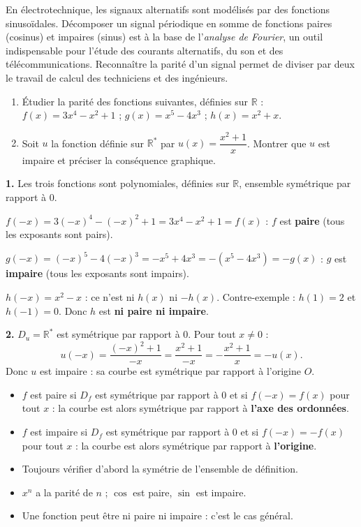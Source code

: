 \documentclass[11pt]{article}
\newcommand{\cle}[1]{{\popxbold\color{popdark}#1}}
\begin{document}
\begin{savaistu}
En électrotechnique, les signaux alternatifs sont modélisés par des fonctions sinusoïdales. Décomposer un signal périodique en somme de fonctions paires (cosinus) et impaires (sinus) est à la base de l'\emph{analyse de Fourier}, un outil indispensable pour l'étude des courants alternatifs, du son et des télécommunications. Reconnaître la parité d'un signal permet de diviser par deux le travail de calcul des techniciens et des ingénieurs.
\end{savaistu}

\begin{exercice}
\begin{enumerate}
\item Étudier la parité des fonctions suivantes, définies sur $\mathbb{R}$ : $f(x)=3x^4-x^2+1$ ; $g(x)=x^5-4x^3$ ; $h(x)=x^2+x$.
\item Soit $u$ la fonction définie sur $\mathbb{R}^*$ par $u(x)=\dfrac{x^2+1}{x}$. Montrer que $u$ est impaire et préciser la conséquence graphique.
\end{enumerate}
\end{exercice}

\begin{corrige}[Exercice 1]
\textbf{1.} Les trois fonctions sont polynomiales, définies sur $\mathbb{R}$, ensemble symétrique par rapport à $0$.

$f(-x)=3(-x)^4-(-x)^2+1=3x^4-x^2+1=f(x)$ : $f$ est \textbf{paire} (tous les exposants sont pairs).

$g(-x)=(-x)^5-4(-x)^3=-x^5+4x^3=-(x^5-4x^3)=-g(x)$ : $g$ est \textbf{impaire} (tous les exposants sont impairs).

$h(-x)=x^2-x$ : ce n'est ni $h(x)$ ni $-h(x)$. Contre-exemple : $h(1)=2$ et $h(-1)=0$. Donc $h$ est \textbf{ni paire ni impaire}.

\textbf{2.} $D_u=\mathbb{R}^*$ est symétrique par rapport à $0$. Pour tout $x\neq 0$ :
\[ u(-x)=\frac{(-x)^2+1}{-x}=\frac{x^2+1}{-x}=-\frac{x^2+1}{x}=-u(x). \]
Donc $u$ est impaire : sa courbe est symétrique par rapport à l'origine $O$.
\end{corrige}

\begin{aretenir}
\begin{itemize}
\item $f$ est \cle{paire} si $D_f$ est symétrique par rapport à $0$ et si $f(-x)=f(x)$ pour tout $x$ : la courbe est alors symétrique par rapport à \textbf{l'axe des ordonnées}.
\item $f$ est \cle{impaire} si $D_f$ est symétrique par rapport à $0$ et si $f(-x)=-f(x)$ pour tout $x$ : la courbe est alors symétrique par rapport à \textbf{l'origine}.
\item Toujours vérifier d'abord la symétrie de l'ensemble de définition.
\item $x^n$ a la parité de $n$ ; $\cos$ est paire, $\sin$ est impaire.
\item Une fonction peut être ni paire ni impaire : c'est le cas général.
\end{itemize}
\end{aretenir}
\end{document}
